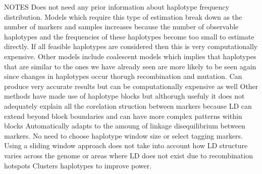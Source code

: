 \documentclass[a4paper,11pt,twoside,abstraction,titlepage]{article}
\begin{document}
NOTES
Does not need any prior information about haplotype frequency distribution. Models which require this type of estimation break down as the number of markers and samples increases because the number of observable haplotypes and the frequencies of these haplotypes become too small to estimate directly. If all feasible haplotypes are considered then this is very computationally expensive.
Other models include coalescent models which implies that haplotypes that are similar to the ones we have already seen are more likely to be seen again since changes in haplotypes occur thorugh recombination and mutation. Can produce very accurate results but can be computationally expensive as well
Other methods have made use of haplotype blocks but althorugh usefuly it does not adequately explain all the corelation struction between markers because LD can extend beyond block boundaries and can have more complex patterns within blocks
Automatically adapts to the amoung of linkage disequilibrium between markers.  No need to choose haplotype window size or select tagging markers.
Using a sliding window approach does not take into account how LD structure varies across the genome or areas where LD does not exist due to recombination hotspots 
Clusters haplotypes to improve power.
\end{document}
